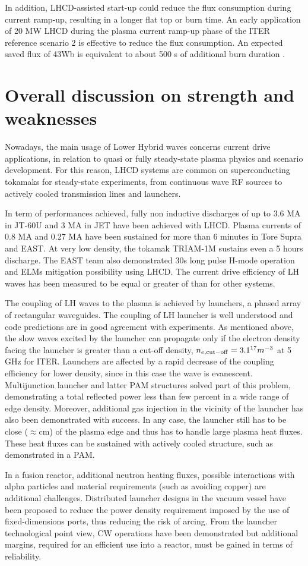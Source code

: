 In addition, LHCD-assisted start-up could reduce the flux consumption during current ramp-up, resulting in a longer flat top or burn time. An early application of 20 MW LHCD during the plasma current ramp-up phase of the ITER reference scenario 2 is effective to reduce the flux consumption. An expected saved flux of 43Wb is equivalent to about 500 s of additional burn duration \parencite{Hoang2009}.

\section{Overall discussion on strength and weaknesses}
Nowadays, the main usage of Lower Hybrid waves concerns current drive applications, in relation to quasi or fully steady-state plasma physics and scenario development. For this reason, LHCD systems are common on superconducting tokamaks for steady-state experiments, from continuous wave RF sources to actively cooled transmission lines and launchers.  

In term of performances achieved, fully non inductive discharges of up to 3.6 MA in JT-60U and 3 MA in JET have been achieved with LHCD. Plasma currents of 0.8 MA and 0.27 MA have been sustained for more than 6 minutes in Tore Supra and EAST. At very low density, the tokamak TRIAM-1M sustains even a 5 hours discharge. The EAST team also demonstrated 30s long pulse H-mode operation and ELMs mitigation possibility using LHCD. The current drive efficiency of LH waves has been measured to be equal or greater of than for other systems.

The coupling of LH waves to the plasma is achieved by launchers, a phased array of rectangular waveguides. The coupling of LH launcher is well understood and code predictions are in good agreement with experiments. As mentioned above, the slow waves excited by the launcher can propagate only if the electron density facing the launcher is greater than a cut-off density, $n_{e, \mathrm{cut-off}} = 3.1\time10^{17} m^{-3}$ at 5 GHz for ITER. Launchers are affected by a rapid decrease of the coupling efficiency for lower density, since in this case the wave is evanescent. Multijunction launcher and latter PAM structures solved part of this problem, demonstrating a total reflected power less than few percent in a wide range of edge density. Moreover, additional gas injection in the vicinity of the launcher has also been demonstrated with success. In any case, the launcher still has to be close ($\approx$cm) of the plasma edge and thus has to handle large plasma heat fluxes. These heat fluxes can be sustained with actively cooled structure, such as demonstrated in a PAM. 

In a fusion reactor, additional neutron heating fluxes, possible interactions with alpha particles and material requirements (such as avoiding copper) are additional challenges. Distributed launcher designs in the vacuum vessel have been proposed to reduce the power density requirement imposed by the use of fixed-dimensions ports, thus reducing the risk of arcing. From the launcher technological point view, CW operations have been demonstrated but additional margins, required for an efficient use into a reactor, must be gained in terms of reliability. 




